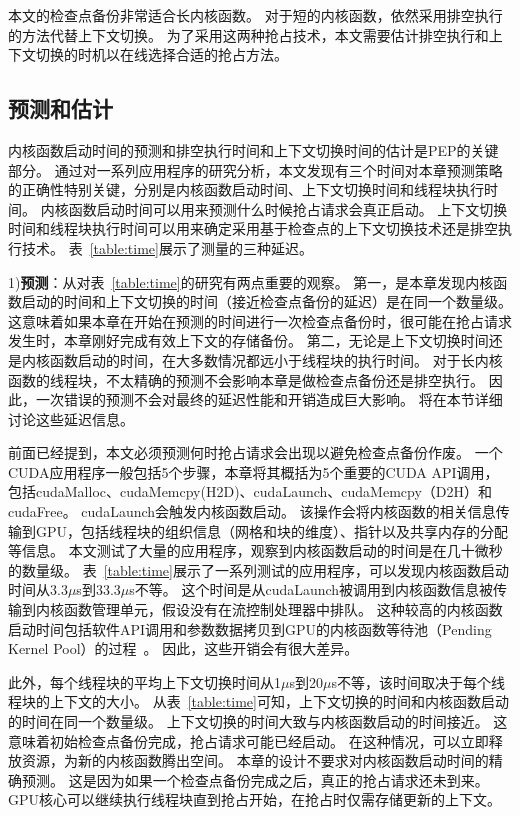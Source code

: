 本文的检查点备份非常适合长内核函数。
对于短的内核函数，依然采用排空执行的方法代替上下文切换。
为了采用这两种抢占技术，本文需要估计排空执行和上下文切换的时机以在线选择合适的抢占方法。

\subsection{预测和估计}
内核函数启动时间的预测和排空执行时间和上下文切换时间的估计是PEP的关键部分。
通过对一系列应用程序的研究分析，本文发现有三个时间对本章预测策略的正确性特别关键，分别是内核函数启动时间、上下文切换时间和线程块执行时间。
内核函数启动时间可以用来预测什么时候抢占请求会真正启动。
上下文切换时间和线程块执行时间可以用来确定采用基于检查点的上下文切换技术还是排空执行技术。
表~\ref{table:time}展示了测量的三种延迟。

1)\textbf{预测}：从对表~\ref{table:time}的研究有两点重要的观察。
第一，是本章发现内核函数启动的时间和上下文切换的时间（接近检查点备份的延迟）是在同一个数量级。
这意味着如果本章在开始在预测的时间进行一次检查点备份时，很可能在抢占请求发生时，本章刚好完成有效上下文的存储备份。
第二，无论是上下文切换时间还是内核函数启动的时间，在大多数情况都远小于线程块的执行时间。
对于长内核函数的线程块，不太精确的预测不会影响本章是做检查点备份还是排空执行。
因此，一次错误的预测不会对最终的延迟性能和开销造成巨大影响。
将在本节详细讨论这些延迟信息。

前面已经提到，本文必须预测何时抢占请求会出现以避免检查点备份作废。
一个CUDA应用程序一般包括5个步骤，本章将其概括为5个重要的CUDA API调用，包括cudaMalloc、cudaMemcpy(H2D)、cudaLaunch、cudaMemcpy（D2H）和cudaFree。
cudaLaunch会触发内核函数启动。
该操作会将内核函数的相关信息传输到GPU，包括线程块的组织信息（网格和块的维度）、指针以及共享内存的分配等信息。
本文测试了大量的应用程序，观察到内核函数启动的时间是在几十微秒的数量级。
表~\ref{table:time}展示了一系列测试的应用程序，可以发现内核函数启动时间从3.3$\mu$s到33.3$\mu$s不等。
这个时间是从cudaLaunch被调用到内核函数信息被传输到内核函数管理单元，假设没有在流控制处理器中排队。
这种较高的内核函数启动时间包括软件API调用和参数数据拷贝到GPU的内核函数等待池（Pending Kernel Pool）的过程~。
因此，这些开销会有很大差异。

此外，每个线程块的平均上下文切换时间从1$\mu$s到20$\mu$s不等，该时间取决于每个线程块的上下文的大小。
从表~\ref{table:time}可知，上下文切换的时间和内核函数启动的时间在同一个数量级。
上下文切换的时间大致与内核函数启动的时间接近。
这意味着初始检查点备份完成，抢占请求可能已经启动。
在这种情况，可以立即释放资源，为新的内核函数腾出空间。
本章的设计不要求对内核函数启动时间的精确预测。
这是因为如果一个检查点备份完成之后，真正的抢占请求还未到来。
GPU核心可以继续执行线程块直到抢占开始，在抢占时仅需存储更新的上下文。

